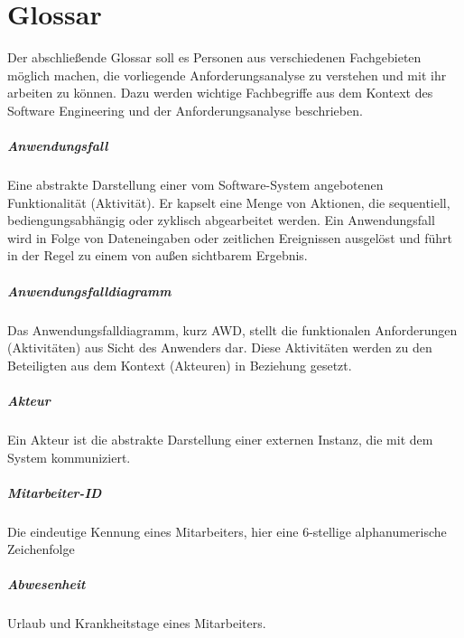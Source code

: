 \newpage

\chapter{Glossar}
Der abschlie{\ss}ende Glossar soll es Personen aus verschiedenen Fachgebieten möglich machen, die vorliegende Anforderungsanalyse zu verstehen und mit ihr arbeiten zu können. Dazu werden wichtige Fachbegriffe aus dem Kontext des Software Engineering und der Anforderungsanalyse beschrieben.

\paragraph{Anwendungsfall}
Eine abstrakte Darstellung einer vom Software-System angebotenen Funktionalität (Aktivität). Er kapselt eine Menge von Aktionen, die sequentiell, bediengungsabhängig oder zyklisch abgearbeitet werden. Ein Anwendungsfall wird in Folge von Dateneingaben oder zeitlichen Ereignissen ausgelöst und führt in der Regel zu einem von au{\ss}en sichtbarem Ergebnis.

\paragraph{Anwendungsfalldiagramm}
Das Anwendungsfalldiagramm, kurz AWD, stellt die funktionalen Anforderungen (Aktivitäten) aus Sicht des Anwenders dar. Diese Aktivitäten werden zu den Beteiligten aus dem Kontext (Akteuren) in Beziehung gesetzt.

\paragraph{Akteur}
Ein Akteur ist die abstrakte Darstellung einer externen Instanz, die mit dem System kommuniziert.

\paragraph{Mitarbeiter-ID} Die eindeutige Kennung eines Mitarbeiters, hier eine 6-stellige alphanumerische Zeichenfolge

\paragraph{Abwesenheit} Urlaub und Krankheitstage eines Mitarbeiters.







